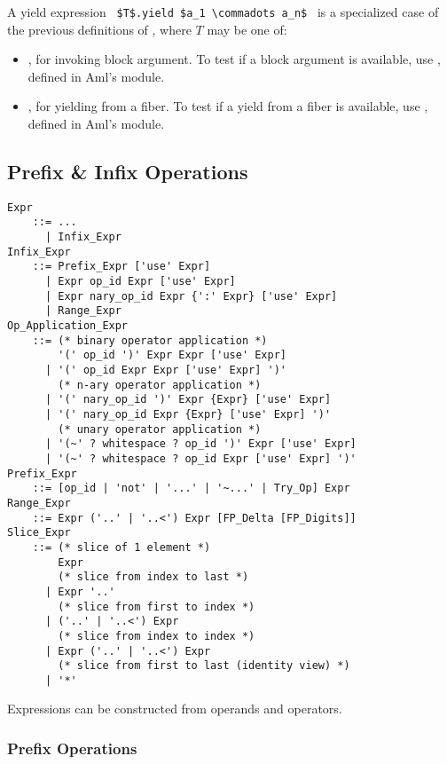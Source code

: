 A yield expression ~\lstinline!$T$.yield $a_1 \commadots a_n$!~ is a specialized case of the previous definitions of , where $T$ may be one of:
\begin{itemize}
  \item {}, for invoking block argument. To test if a block argument is available, use , defined in Aml's  module. 
  \item {}, for yielding from a fiber. To test if a yield from a fiber is available, use , defined in Aml's  module. 
\end{itemize}





\subsection{Prefix \& Infix Operations}
\label{sec:prefix-infix-ops}

\grammar\begin{lstlisting}
Expr
    ::= ...
      | Infix_Expr
Infix_Expr 
    ::= Prefix_Expr ['use' Expr]
      | Expr op_id Expr ['use' Expr]
      | Expr nary_op_id Expr {':' Expr} ['use' Expr] 
      | Range_Expr
Op_Application_Expr
    ::= (* binary operator application *)
        '(' op_id ')' Expr Expr ['use' Expr]
      | '(' op_id Expr Expr ['use' Expr] ')'
        (* n-ary operator application *)
      | '(' nary_op_id ')' Expr {Expr} ['use' Expr]
      | '(' nary_op_id Expr {Expr} ['use' Expr] ')'
        (* unary operator application *)
      | '(~' ? whitespace ? op_id ')' Expr ['use' Expr]
      | '(~' ? whitespace ? op_id Expr ['use' Expr] ')'
Prefix_Expr 
    ::= [op_id | 'not' | '...' | '~...' | Try_Op] Expr
Range_Expr
    ::= Expr ('..' | '..<') Expr [FP_Delta [FP_Digits]]
Slice_Expr
    ::= (* slice of 1 element *)
        Expr 
        (* slice from index to last *)
      | Expr '..'
        (* slice from first to index *)
      | ('..' | '..<') Expr
        (* slice from index to index *)
      | Expr ('..' | '..<') Expr
        (* slice from first to last (identity view) *)
      | '*'
\end{lstlisting}

Expressions can be constructed from operands and operators. 





\subsubsection{Prefix Operations}

